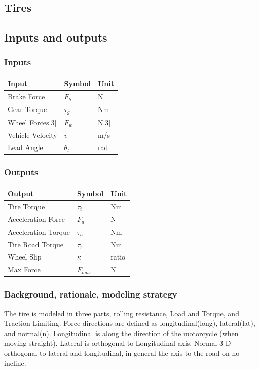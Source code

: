 \documentclass[../SimBALink.tex]{subfiles}
\begin{document}
\subsection{Tires}
\subsection{Inputs and outputs}
	\subsubsection{Inputs}
	\begin{tabular}{ l | l | l  }
		Input					&	Symbol		&	Unit		\\	\hline
		Brake Force				& 	$F_b$ 		&	N \\
		Gear Torque				&	$\tau_g$	&	Nm \\
		Wheel Forces[3]			&	$F_w$		&	N[3] \\
		Vehicle Velocity		&	$v$			&	m/s \\
		Lead Angle				&	$\theta_l$	&	rad \\
	\end{tabular}
	
	\subsubsection{Outputs}
	\begin{tabular}{ l | l | l  }
		Output					&	Symbol			&	Unit		\\	\hline
		Tire Torque				&	$\tau_t$		&	Nm \\
		Acceleration Force		&	$F_a$			&	N \\
		Acceleration Torque		&	$\tau_a$		&	Nm \\
		Tire Road Torque		&	$\tau_r$		&	Nm \\
		Wheel Slip				&	$\kappa$ 		&	ratio \\ 			
		Max Force 				&	$F_{max}$		&	N \\
	\end{tabular}

\subsubsection{Background, rationale, modeling strategy} The tire is modeled in three parts, rolling resistance, Load and Torque, and Traction Limiting. Force directions are defined as longitudinal(long), lateral(lat), and normal(n). Longitudinal is along the direction of the motorcycle (when moving straight). Lateral is orthogonal to Longitudinal axis. Normal 3-D orthogonal to lateral and longitudinal, in general the axis to the road on no incline.
\end{document}

